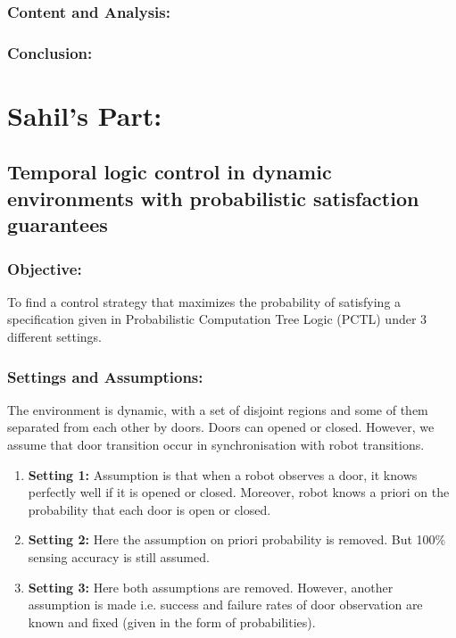 \documentclass{article}
\begin{document}
\subsubsection{Content and Analysis:}

\subsubsection{Conclusion:}



\section{Sahil's Part:}
\subsection{Temporal logic control in dynamic environments with probabilistic satisfaction guarantees}
\subsubsection{Objective:}
To find a control strategy that maximizes the
probability of satisfying a specification given in Probabilistic
Computation Tree Logic (PCTL) under 3 different settings.
\subsubsection{Settings and Assumptions:}
The environment is dynamic, with a set of disjoint regions and some of them separated from each other by doors. Doors can opened or closed.
However, we assume that door transition occur in synchronisation with robot transitions.
\begin{enumerate}
    \item \textbf{Setting 1:}
        Assumption is that when a robot observes a door, it knows perfectly well if it is opened or closed. Moreover, robot knows a priori on the probability that each door is open or closed.
    \item \textbf{Setting 2:}
        Here the assumption on priori probability is removed. But 100\% sensing accuracy is still assumed.
    \item \textbf{Setting 3:}
        Here both assumptions are removed. However, another assumption is made i.e. success and failure rates of door observation are known and fixed (given in the form of probabilities).
\end{enumerate}
\end{document}
